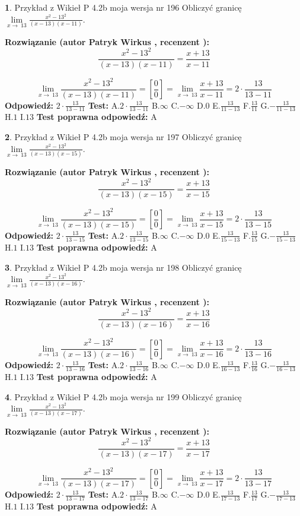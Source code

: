 \documentclass[12pt, a4paper]{article}
\theoremstyle{definition} %
\newtheorem{zad}{}
\newcommand{\zadStart}[1]{\begin{zad}#1\newline}
\newcommand{\zadStop}{\end{zad}}
\newcommand{\rozwStart}[2]{\noindent \textbf{Rozwiązanie (autor #1 , recenzent #2): }\newline}
\newcommand{\rozwStop}{\newline}
\newcommand{\odpStart}{\noindent \textbf{Odpowiedź:}\newline}
\newcommand{\odpStop}{\newline}
\newcommand{\testStart}{\noindent \textbf{Test:}\newline}
\newcommand{\testStop}{\newline}
\newcommand{\kluczStart}{\noindent \textbf{Test poprawna odpowiedź:}\newline}
\newcommand{\kluczStop}{\newline}
\begin{document}
\zadStart{Przykład z Wikieł P 4.2b moja wersja nr 196}
Obliczyć granicę $\lim\limits_{x\to\ 13}\frac{x^{2}-13^{2}}{(x-13)(x-11)}$.
\zadStop
\rozwStart{Patryk Wirkus}{}
$$\frac{x^{2}-13^{2}}{(x-13)(x-11)}=\frac{x+13}{x-11}$$

$$\lim\limits_{x\to\ 13}\frac{x^{2}-13^{2}}{(x-13)(x-11)}=[\frac{0}{0}]=\lim\limits_{x\to\ 13}\frac{x+13}{x-11}=2 \cdot \frac{13}{13-11}$$
\rozwStop
\odpStart
$2 \cdot \frac{13}{13-11}$
\odpStop
\testStart
A.$2 \cdot \frac{13}{13-11}$
B.$\infty$
C.$-\infty$
D.$0$
E.$\frac{13}{11-13}$
F.$\frac{13}{11}$
G.$-\frac{13}{11-13}$
H.$1$
I.$13$
\testStop
\kluczStart
A
\kluczStop



\zadStart{Przykład z Wikieł P 4.2b moja wersja nr 197}
Obliczyć granicę $\lim\limits_{x\to\ 13}\frac{x^{2}-13^{2}}{(x-13)(x-15)}$.
\zadStop
\rozwStart{Patryk Wirkus}{}
$$\frac{x^{2}-13^{2}}{(x-13)(x-15)}=\frac{x+13}{x-15}$$

$$\lim\limits_{x\to\ 13}\frac{x^{2}-13^{2}}{(x-13)(x-15)}=[\frac{0}{0}]=\lim\limits_{x\to\ 13}\frac{x+13}{x-15}=2 \cdot \frac{13}{13-15}$$
\rozwStop
\odpStart
$2 \cdot \frac{13}{13-15}$
\odpStop
\testStart
A.$2 \cdot \frac{13}{13-15}$
B.$\infty$
C.$-\infty$
D.$0$
E.$\frac{13}{15-13}$
F.$\frac{13}{15}$
G.$-\frac{13}{15-13}$
H.$1$
I.$13$
\testStop
\kluczStart
A
\kluczStop



\zadStart{Przykład z Wikieł P 4.2b moja wersja nr 198}
Obliczyć granicę $\lim\limits_{x\to\ 13}\frac{x^{2}-13^{2}}{(x-13)(x-16)}$.
\zadStop
\rozwStart{Patryk Wirkus}{}
$$\frac{x^{2}-13^{2}}{(x-13)(x-16)}=\frac{x+13}{x-16}$$

$$\lim\limits_{x\to\ 13}\frac{x^{2}-13^{2}}{(x-13)(x-16)}=[\frac{0}{0}]=\lim\limits_{x\to\ 13}\frac{x+13}{x-16}=2 \cdot \frac{13}{13-16}$$
\rozwStop
\odpStart
$2 \cdot \frac{13}{13-16}$
\odpStop
\testStart
A.$2 \cdot \frac{13}{13-16}$
B.$\infty$
C.$-\infty$
D.$0$
E.$\frac{13}{16-13}$
F.$\frac{13}{16}$
G.$-\frac{13}{16-13}$
H.$1$
I.$13$
\testStop
\kluczStart
A
\kluczStop



\zadStart{Przykład z Wikieł P 4.2b moja wersja nr 199}
Obliczyć granicę $\lim\limits_{x\to\ 13}\frac{x^{2}-13^{2}}{(x-13)(x-17)}$.
\zadStop
\rozwStart{Patryk Wirkus}{}
$$\frac{x^{2}-13^{2}}{(x-13)(x-17)}=\frac{x+13}{x-17}$$

$$\lim\limits_{x\to\ 13}\frac{x^{2}-13^{2}}{(x-13)(x-17)}=[\frac{0}{0}]=\lim\limits_{x\to\ 13}\frac{x+13}{x-17}=2 \cdot \frac{13}{13-17}$$
\rozwStop
\odpStart
$2 \cdot \frac{13}{13-17}$
\odpStop
\testStart
A.$2 \cdot \frac{13}{13-17}$
B.$\infty$
C.$-\infty$
D.$0$
E.$\frac{13}{17-13}$
F.$\frac{13}{17}$
G.$-\frac{13}{17-13}$
H.$1$
I.$13$
\testStop
\kluczStart
A
\kluczStop
\end{document}
